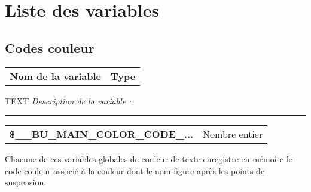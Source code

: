 \documentclass[a4paper,10pt]{article}
\begin{document}
    \color{sec1}
    \section{Liste des variables}\color{text}

    \color{sec2}
    \subsection{Codes couleur}\color{text}

    \begin{justify}
        \begin{tabular}{l|l}
            \textbf{Nom de la variable} & \textbf{Type}
        \end{tabular}
    \end{justify}

    \begin{justify}TEXT
        \textit{Description de la variable :}
    \end{justify}


    \par\noindent\rule{\textwidth}{0.4pt}

    \begin{justify}
        \begin{tabular}{l|l}
            \textbf{\color{vars}\$\_\_BU\_MAIN\_COLOR\_CODE\_...}  & Nombre entier\\
        \end{tabular}
    \end{justify}

    \begin{justify}
        Chacune de ces variables globales de couleur de texte enregistre en mémoire le code couleur associé à la couleur dont le nom figure après les points de suspension.
    \end{justify}
\end{document}
